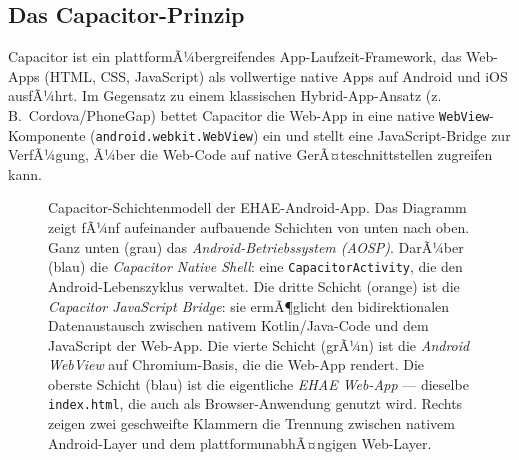 ﻿\documentclass[12pt,a4paper]{article}
\begin{document}
\subsection{Das Capacitor-Prinzip}

Capacitor ist ein plattformÃ¼bergreifendes App-Laufzeit-Framework, das Web-Apps
(HTML, CSS, JavaScript) als vollwertige native Apps auf Android und iOS ausfÃ¼hrt.
Im Gegensatz zu einem klassischen Hybrid-App-Ansatz (z.\,B.\ Cordova/PhoneGap)
bettet Capacitor die Web-App in eine native \texttt{WebView}-Komponente
(\texttt{android.webkit.WebView}) ein und stellt eine JavaScript-Bridge zur VerfÃ¼gung,
Ã¼ber die Web-Code auf native GerÃ¤teschnittstellen zugreifen kann.

\begin{figure}[h]
\centering
{}
\caption{Capacitor-Schichtenmodell der EHAE-Android-App. Das Diagramm zeigt fÃ¼nf
  aufeinander aufbauende Schichten von unten nach oben. Ganz unten (grau) das
  \emph{Android-Betriebssystem (AOSP)}. DarÃ¼ber (blau) die \emph{Capacitor Native
  Shell}: eine \texttt{CapacitorActivity}, die den Android-Lebenszyklus verwaltet.
  Die dritte Schicht (orange) ist die \emph{Capacitor JavaScript Bridge}: sie
  ermÃ¶glicht den bidirektionalen Datenaustausch zwischen nativem Kotlin/Java-Code
  und dem JavaScript der Web-App. Die vierte Schicht (grÃ¼n) ist die
  \emph{Android WebView} auf Chromium-Basis, die die Web-App rendert.
  Die oberste Schicht (blau) ist die eigentliche \emph{EHAE Web-App} --- dieselbe
  \texttt{index.html}, die auch als Browser-Anwendung genutzt wird. Rechts zeigen
  zwei geschweifte Klammern die Trennung zwischen nativem Android-Layer und dem
  plattformunabhÃ¤ngigen Web-Layer.}
\label{fig:capacitor_stack}
\end{figure}
\end{document}
